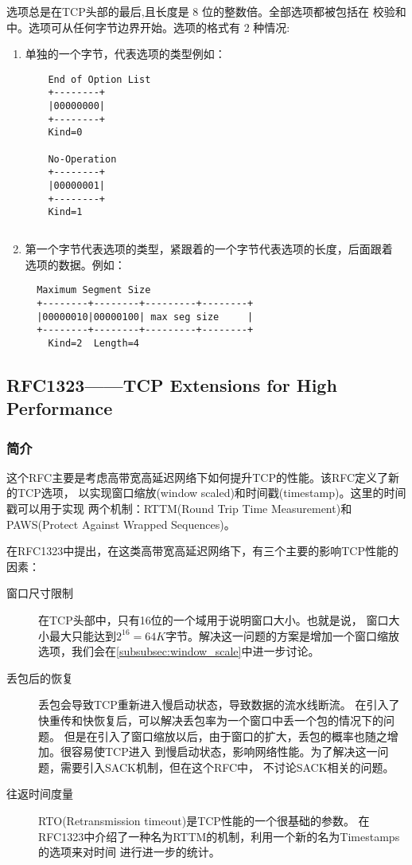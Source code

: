     选项总是在TCP头部的最后,且长度是 8 位的整数倍。全部选项都被包括在
校验和中。选项可从任何字节边界开始。选项的格式有 2 种情况:
\begin{enumerate}
\item 单独的一个字节，代表选项的类型例如：

\begin{verbatim}
	End of Option List
	+--------+
	|00000000| 
	+--------+ 
	Kind=0

	No-Operation
	+--------+
	|00000001|
	+--------+
	Kind=1
\end{verbatim}


\begin{verbatim}

\end{verbatim}


\item 第一个字节代表选项的类型，紧跟着的一个字节代表选项的长度，后面跟着
选项的数据。例如：

\begin{verbatim}
  Maximum Segment Size
  +--------+--------+---------+--------+ 
  |00000010|00000100| max seg size     | 
  +--------+--------+---------+--------+ 
    Kind=2  Length=4
\end{verbatim}

\end{enumerate}

\subsection{RFC1323——TCP Extensions for High Performance}
\label{subsec:rfc1323}

\subsubsection{简介}
\label{subsubsec:rfc1323_introduce}

这个RFC主要是考虑高带宽高延迟网络下如何提升TCP的性能。该RFC定义了新的TCP选项，
以实现窗口缩放(window scaled)和时间戳(timestamp)。这里的时间戳可以用于实现
两个机制：RTTM(Round Trip Time Measurement)和PAWS(Protect Against Wrapped Sequences)。

在RFC1323中提出，在这类高带宽高延迟网络下，有三个主要的影响TCP性能的因素：
\begin{description}
  \item[窗口尺寸限制] 在TCP头部中，只有16位的一个域用于说明窗口大小。也就是说，
    窗口大小最大只能达到$2^{16}=64K$字节。解决这一问题的方案是增加一个窗口缩放
    选项，我们会在\ref{subsubsec:window_scale}中进一步讨论。
  \item[丢包后的恢复] 丢包会导致TCP重新进入慢启动状态，导致数据的流水线断流。
    在引入了快重传和快恢复后，可以解决丢包率为一个窗口中丢一个包的情况下的问题。
    但是在引入了窗口缩放以后，由于窗口的扩大，丢包的概率也随之增加。很容易使TCP进入
    到慢启动状态，影响网络性能。为了解决这一问题，需要引入SACK机制，但在这个RFC中，
    不讨论SACK相关的问题。
  \item[往返时间度量] RTO(Retransmission timeout)是TCP性能的一个很基础的参数。
    在RFC1323中介绍了一种名为RTTM的机制，利用一个新的名为Timestamps的选项来对时间
    进行进一步的统计。
\end{description}

